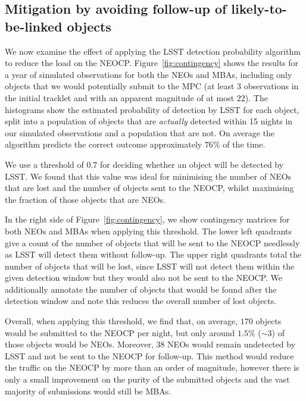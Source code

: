 \documentclass[twocolumn]{aastex631}
\newcommand{\npernightAlg}{170}
\newcommand{\purityAlg}{1.5}
\newcommand{\purityAlgRaw}{3}
\newcommand{\neoLostAlg}{38}
\newcommand{\efficiencyAlg}{76}
\newcommand{\thresholdAlg}{0.7}
\begin{document}
\subsection{Mitigation by avoiding follow-up of likely-to-be-linked objects}\label{sec:using_alg}
We now examine the effect of applying the LSST detection probability algorithm to reduce the load on the NEOCP. Figure~\ref{fig:contingency} shows the results for a year of simulated observations for both the NEOs and MBAs, including only objects that we would potentially submit to the MPC (at least 3 observations in the initial tracklet and with an apparent magnitude of at most $22$). The histograms show the estimated probability of detection by LSST for each object, split into a population of objects that are \textit{actually} detected within 15 nights in our simulated observations and a population that are not. On average the algorithm predicts the correct outcome approximately $\efficiencyAlg{}\%$ of the time.

We use a threshold of $\thresholdAlg{}$ for deciding whether an object will be detected by LSST. We found that this value was ideal for minimising the number of NEOs that are lost and the number of objects sent to the NEOCP, whilst maximising the fraction of those objects that are NEOs.

In the right side of Figure~\ref{fig:contingency}, we show contingency matrices for both NEOs and MBAs when applying this threshold. The lower left quadrants give a count of the number of objects that will be sent to the NEOCP needlessly as LSST will detect them without follow-up. The upper right quadrants total the number of objects that will be lost, since LSST will not detect them within the given detection window but they would also not be sent to the NEOCP. We additionally annotate the number of objects that would be found after the detection window and note this reduces the overall number of lost objects.

Overall, when applying this threshold, we find that, on average, $\npernightAlg{}$ objects would be submitted to the NEOCP per night, but only around $\purityAlg{}\%$ (${\sim}\purityAlgRaw{}$) of those objects would be NEOs. Moreover, $\neoLostAlg{}$ NEOs would remain undetected by LSST and not be sent to the NEOCP for follow-up. This method would reduce the traffic on the NEOCP by more than an order of magnitude, however there is only a small improvement on the purity of the submitted objects and the vast majority of submissions would still be MBAs. 
\end{document}

